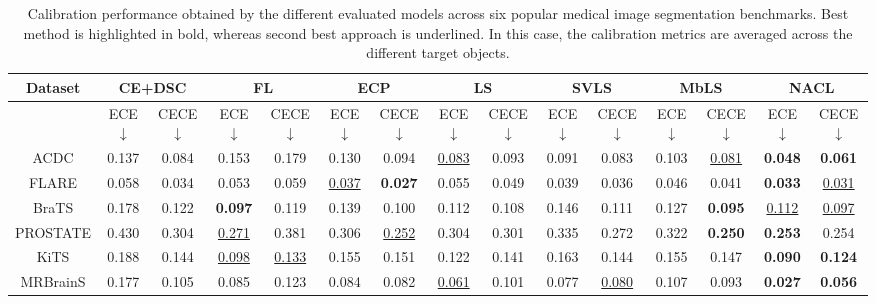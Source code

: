 \documentclass[twocolumn,final,10pt]{elsarticle}
\newcommand{\ours}{\mbox{NACL}}
\newcommand\und[1]{\underline{#1}}
\newcommand{\rev}[1]{{\color{black}#1}}
\begin{document}
\begin{table}[h!]
\scriptsize
\centering
\caption{Calibration performance obtained by the different evaluated models across six popular medical image segmentation benchmarks. Best method is highlighted in bold, whereas second best approach is underlined. In this case, the calibration metrics are averaged across the different target objects.}
\label{tab:main-cal}
\begin{tabular}{c|cccccccccccccc}
\toprule
Dataset & \multicolumn{2}{c}{CE+DSC} & \multicolumn{2}{c}{FL} & \multicolumn{2}{c}{ECP} & \multicolumn{2}{c}{LS} & \multicolumn{2}{c}{SVLS} & \multicolumn{2}{c}{MbLS} & \multicolumn{2}{c}{\ours}\\ 
\midrule
& ECE $\downarrow$ & CECE $\downarrow$ & ECE $\downarrow$ & CECE $\downarrow$ & ECE $\downarrow$ & CECE $\downarrow$  & ECE $\downarrow$ & CECE $\downarrow$  & ECE $\downarrow$ & CECE $\downarrow$  & ECE $\downarrow$ & CECE $\downarrow$ & ECE $\downarrow$ & CECE $\downarrow$  \\
\midrule
ACDC & 0.137 & 0.084 & 0.153 & 0.179 & 0.130 & 0.094 &\und{0.083} & 0.093 & 0.091 & 0.083 & 0.103 & \und{0.081} & \textbf{0.048} & \textbf{0.061} \\ %
FLARE & 0.058 & 0.034 & 0.053 & 0.059 & \und{0.037} & \textbf{0.027} & 0.055 & 0.049 & 0.039 & 0.036 & 0.046 & 0.041 & \textbf{0.033} & \underline{0.031} \\ %
BraTS & 0.178 & 0.122 & \textbf{0.097} & 0.119 & 0.139 & 0.100 & 0.112 & 0.108 & 0.146 & 0.111 & 0.127 & \textbf{0.095} & \underline{0.112} & \underline{0.097} \\ %
\rev{PROSTATE} & \rev{0.430} & \rev{0.304} & \rev{\und{0.271}} & \rev{0.381} & \rev{0.306} & \rev{\und{0.252}} & \rev{0.304} & \rev{0.301} & \rev{0.335} & \rev{0.272} & \rev{0.322} & \rev{\textbf{0.250}} & \rev{\textbf{0.253}} & \rev{0.254} \\ %
\rev{KiTS} & \rev{0.188} & \rev{0.144} & \rev{\und{0.098}} & \rev{\und{0.133}} & \rev{0.155} & \rev{0.151} & \rev{0.122} & \rev{0.141} & \rev{0.163} & \rev{0.144} & \rev{0.155} & \rev{0.147} & \rev{\textbf{0.090}} & \rev{\textbf{0.124}} \\ %
\rev{MRBrainS} & \rev{0.177} & \rev{0.105} & \rev{0.085} & \rev{0.123} & \rev{0.084} & \rev{0.082} & \rev{\und{0.061}} & \rev{0.101} & \rev{0.077} & \rev{\und{0.080}} & \rev{0.107} & \rev{0.093} & \rev{\textbf{0.027}} & \rev{\textbf{0.056}} \\ %
\bottomrule
\end{tabular}
\end{table}
\end{document}
